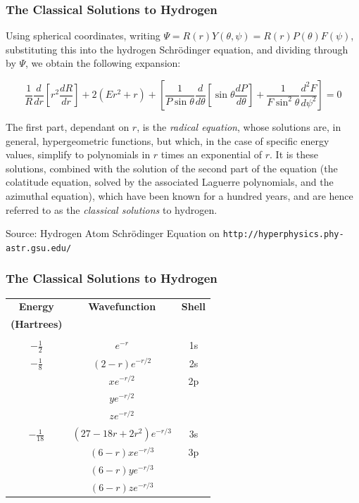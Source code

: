 \documentclass{beamer}
\begin{document}
\begin{frame}
\frametitle{The Classical Solutions to Hydrogen}
Using spherical coordinates, writing $\Psi=R(r)Y(\theta, \psi) = R(r)P(\theta)F(\psi)$,
substituting this into the hydrogen Schr\"odinger equation, and dividing through by $\Psi$,
we obtain the following expansion:

\begin{equation*}
\frac{1}{R} \frac{d}{dr}\left[ r^2 \frac{dR}{dr}\right] + 2(Er^2 + r)
+ \left[\frac{1}{P\sin\theta} \frac{d}{d\theta}\left[\sin\theta\frac{dP}{d\theta}\right]+\frac{1}{F\sin^2\theta}\frac{d^2 F}{d\psi^2}\right] = 0
\end{equation*}

The first part, dependant on $r$, is the {\it radical equation}, whose solutions are, in general,
hypergeometric functions, but which, in the case of specific energy values,
simplify to polynomials in $r$
times an exponential of $r$.  It is these solutions, combined with the solution
of the second part of the equation (the colatitude equation, solved by the associated Laguerre polynomials,
and the azimuthal equation), which have been known for a hundred years, and are
hence referred to as the {\it classical solutions} to hydrogen.

Source: Hydrogen Atom Schr\"odinger Equation on {\tt http://hyperphysics.phy-astr.gsu.edu/}
\end{frame}

\begin{frame}
\frametitle{The Classical Solutions to Hydrogen}
\begin{center}
\begin{tabular}{ccc}
{\bf Energy}		& {\bf Wavefunction}		& {\bf Shell} \\
{\bf (Hartrees)}	& & \\
\\
$-\frac{1}{2}$		& $e^{-r}$			& 1s \\
$-\frac{1}{8}$		& $(2-r)e^{-r/2}$		& 2s \\
			& $xe^{-r/2}$			& 2p \\
			& $ye^{-r/2}$			\\
			& $ze^{-r/2}$			\\
$-\frac{1}{18}$		& $(27-18r+2r^2)e^{-r/3}$	& 3s \\
			& $(6-r)xe^{-r/3}$		& 3p \\
			& $(6-r)ye^{-r/3}$		\\
			& $(6-r)ze^{-r/3}$		\\
\end{tabular}
\end{center}
\end{frame}
\end{document}
